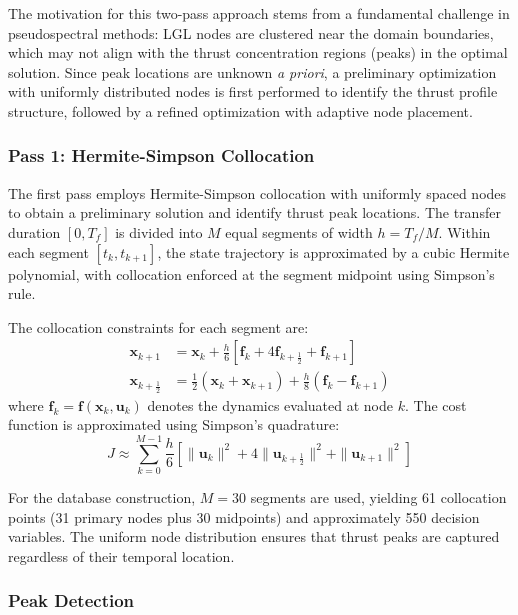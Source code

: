 \documentclass[a4paper,fleqn]{cas-dc}
\begin{document}
The motivation for this two-pass approach stems from a fundamental challenge in pseudospectral methods: LGL nodes are clustered near the domain boundaries, which may not align with the thrust concentration regions (peaks) in the optimal solution. Since peak locations are unknown \textit{a priori}, a preliminary optimization with uniformly distributed nodes is first performed to identify the thrust profile structure, followed by a refined optimization with adaptive node placement.

\subsubsection{Pass 1: Hermite-Simpson Collocation}

The first pass employs Hermite-Simpson collocation with uniformly spaced nodes to obtain a preliminary solution and identify thrust peak locations. The transfer duration $[0, T_f]$ is divided into $M$ equal segments of width $h = T_f/M$. Within each segment $[t_k, t_{k+1}]$, the state trajectory is approximated by a cubic Hermite polynomial, with collocation enforced at the segment midpoint using Simpson's rule.

The collocation constraints for each segment are:
\begin{align}
\mathbf{x}_{k+1} &= \mathbf{x}_k + \frac{h}{6}\left[\mathbf{f}_k + 4\mathbf{f}_{k+\frac{1}{2}} + \mathbf{f}_{k+1}\right] \label{eq:simpson_continuity} \\
\mathbf{x}_{k+\frac{1}{2}} &= \frac{1}{2}(\mathbf{x}_k + \mathbf{x}_{k+1}) + \frac{h}{8}(\mathbf{f}_k - \mathbf{f}_{k+1}) \label{eq:hermite_midpoint}
\end{align}
where $\mathbf{f}_k = \mathbf{f}(\mathbf{x}_k, \mathbf{u}_k)$ denotes the dynamics evaluated at node $k$. The cost function is approximated using Simpson's quadrature:
\begin{equation}
J \approx \sum_{k=0}^{M-1} \frac{h}{6}\left[\|\mathbf{u}_k\|^2 + 4\|\mathbf{u}_{k+\frac{1}{2}}\|^2 + \|\mathbf{u}_{k+1}\|^2\right]
\end{equation}

For the database construction, $M = 30$ segments are used, yielding 61 collocation points (31 primary nodes plus 30 midpoints) and approximately 550 decision variables. The uniform node distribution ensures that thrust peaks are captured regardless of their temporal location.

\subsubsection{Peak Detection}
\end{document}
